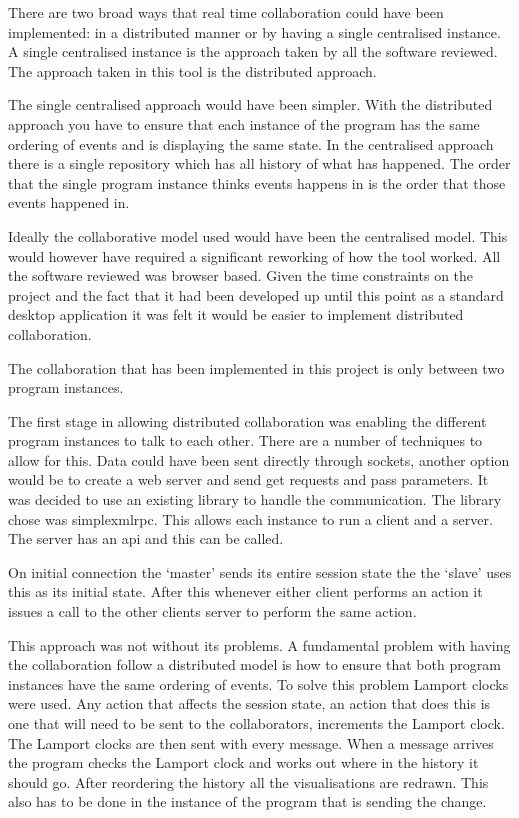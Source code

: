 There are two broad ways that real time collaboration could have been implemented: in a distributed manner or by having a single centralised instance.  A single centralised instance is the approach taken by all the software reviewed.  The approach taken in this tool is the distributed approach.

The single centralised approach would have been simpler.  With the distributed approach you have to ensure that each instance of the program has the same ordering of events and is displaying the same state.  In the centralised approach there is a single repository which has all history of what has happened.  The order that the single program instance thinks events happens in is the order that those events happened in.

Ideally the collaborative model used would have been the centralised model.  This would however have required a significant reworking of how the tool worked.  All the software reviewed was browser based.  Given the time constraints on the project and the fact that it had been developed up until this point as a standard desktop application it was felt it would be easier to implement distributed collaboration.

The collaboration that has been implemented in this project is only between two program instances.

The first stage in allowing distributed collaboration was enabling the different program instances to talk to each other. There are a number of techniques to allow for this.  Data could have been sent directly through sockets, another option would be to create a web server and send get requests and pass parameters.  It was decided to use an existing library to handle the communication.  The library chose was simplexmlrpc.  This allows each instance to run a client and a server.  The server has an api and this can be called.

On initial connection the `master' sends its entire session state the the `slave' uses this as its initial state.  After this whenever either client performs an action it issues a call to the other clients server to perform the same action.

This approach was not without its problems.  A fundamental problem with having the collaboration follow a distributed model is how to ensure that both program instances have the same ordering of events.  To solve this problem Lamport clocks were used.  Any action that affects the session state, an action that does this is one that will need to be sent to the collaborators, increments the Lamport clock.  The Lamport clocks are then sent with every message.  When a message arrives the program checks the Lamport clock and works out where in the history it should go.  After reordering the history all the visualisations are redrawn.  This also has to be done in the instance of the program that is sending the change.

